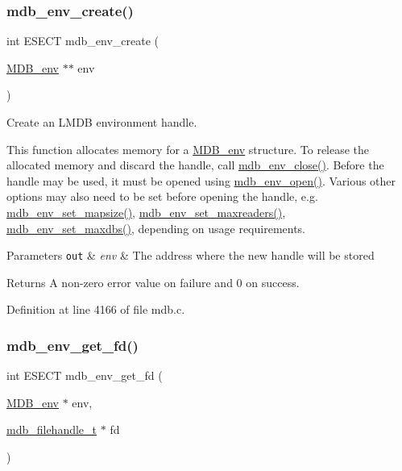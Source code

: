 \subsubsection{\texorpdfstring{mdb\+\_\+env\+\_\+create()}{mdb\_env\_create()}}
{\footnotesize\ttfamily int E\+S\+E\+CT mdb\+\_\+env\+\_\+create (\begin{DoxyParamCaption}\item[{\mbox{\hyperlink{struct_m_d_b__env}{M\+D\+B\+\_\+env}} $\ast$$\ast$}]{env }\end{DoxyParamCaption})}



Create an L\+M\+DB environment handle. 

This function allocates memory for a \mbox{\hyperlink{struct_m_d_b__env}{M\+D\+B\+\_\+env}} structure. To release the allocated memory and discard the handle, call \mbox{\hyperlink{group__mdb_ga4366c43ada8874588b6a62fbda2d1e95}{mdb\+\_\+env\+\_\+close()}}. Before the handle may be used, it must be opened using \mbox{\hyperlink{group__mdb_ga32a193c6bf4d7d5c5d579e71f22e9340}{mdb\+\_\+env\+\_\+open()}}. Various other options may also need to be set before opening the handle, e.\+g. \mbox{\hyperlink{group__mdb_ga4c47a5830f1071e578eaa1bbda2ae83e}{mdb\+\_\+env\+\_\+set\+\_\+mapsize()}}, \mbox{\hyperlink{group__mdb_gae687966c24b790630be2a41573fe40e2}{mdb\+\_\+env\+\_\+set\+\_\+maxreaders()}}, \mbox{\hyperlink{group__mdb_gaa2fc2f1f37cb1115e733b62cab2fcdbc}{mdb\+\_\+env\+\_\+set\+\_\+maxdbs()}}, depending on usage requirements. 
\begin{DoxyParams}[1]{Parameters}
\mbox{\tt out}  & {\em env} & The address where the new handle will be stored \\
\hline
\end{DoxyParams}
\begin{DoxyReturn}{Returns}
A non-\/zero error value on failure and 0 on success. 
\end{DoxyReturn}


Definition at line 4166 of file mdb.\+c.

\mbox{\label{group__internal_ga12687c54a5947c91b24037e32c1d9666}} 
\subsubsection{\texorpdfstring{mdb\+\_\+env\+\_\+get\+\_\+fd()}{mdb\_env\_get\_fd()}}
{\footnotesize\ttfamily int E\+S\+E\+CT mdb\+\_\+env\+\_\+get\+\_\+fd (\begin{DoxyParamCaption}\item[{\mbox{\hyperlink{struct_m_d_b__env}{M\+D\+B\+\_\+env}} $\ast$}]{env,  }\item[{\mbox{\hyperlink{lmdb_8h_a6799f2853adc2e3b863dc2e6d9d0064f}{mdb\+\_\+filehandle\+\_\+t}} $\ast$}]{fd }\end{DoxyParamCaption})}



